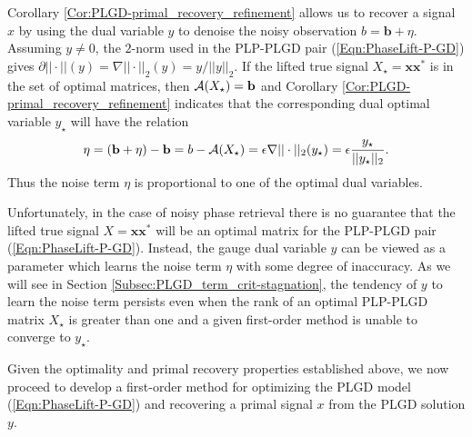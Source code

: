 Corollary \ref{Cor:PLGD-primal_recovery_refinement} allows us to recover a signal $x$ by using the dual variable $y$ to denoise the noisy observation $b = \mathbf{b} + \eta$.
Assuming $y \neq 0$, the $2$-norm used in the PLP-PLGD pair (\ref{Eqn:PhaseLift-P-GD}) gives $\partial ||\cdot||(y) = \nabla ||\cdot||_2(y) = y / ||y||_2$.  
If the lifted true signal $X_\star = \mathbf{x}\mathbf{x}^*$ is in the set of optimal matrices, then ${\mathcal A}(X_\star) = \mathbf{b}$ and Corollary \ref{Cor:PLGD-primal_recovery_refinement} indicates that the corresponding dual optimal variable $y_\star$ will have the relation 
\begin{equation} 			\label{Eqn:PLGD-noise_is_dual_variable}
\eta = (\mathbf{b} + \eta) - \mathbf{b} = b - {\mathcal A}(X_\star)  = \epsilon \nabla ||\cdot||_2(y_\star) = \epsilon \frac{y_\star}{||y_\star||_2}.
\end{equation}
Thus the noise term $\eta$ is proportional to one of the optimal dual variables.  


Unfortunately, in the case of noisy phase retrieval there is no guarantee that the lifted true signal $X = \mathbf{x}\mathbf{x}^*$ will be an optimal matrix for the PLP-PLGD pair (\ref{Eqn:PhaseLift-P-GD}).  
Instead, the gauge dual variable $y$ can be viewed as a parameter which learns the noise term $\eta$ with some degree of inaccuracy.  
As we will see in Section \ref{Subsec:PLGD_term_crit-stagnation}, the tendency of $y$ to learn the noise term persists even when the rank of an optimal PLP-PLGD matrix $X_\star$ is greater than one and a given first-order method is unable to converge to $y_\star$.


Given the optimality and primal recovery properties established above, we now proceed to develop a first-order method for optimizing the PLGD model (\ref{Eqn:PhaseLift-P-GD}) and recovering a primal signal $x$ from the PLGD solution $y$.



